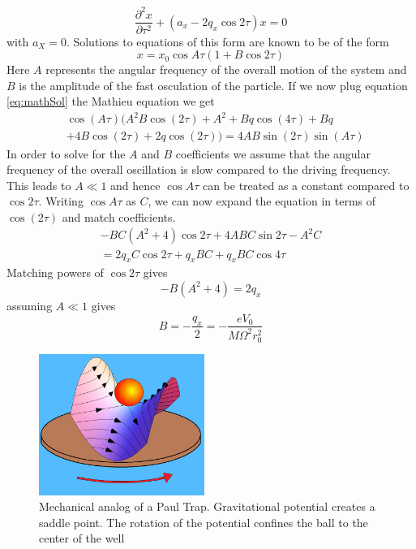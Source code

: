 \documentclass[aps,prb,twocolumn,superscriptaddress]{revtex4-1}
\begin{document}
\begin{equation}
\frac{\partial^2x}{\partial\tau^2} + \left(a_x - 2q_x\cos{2\tau}\right)x=0
\label{eq:matheq}
\end{equation}
with $a_X=0$. Solutions to equations of this form are known to be of the form
\begin{equation}
x=x_0\cos{A\tau}\left(1+B\cos{2\tau}\right)
\label{eq:mathSol}
\end{equation}
Here $A$ represents the angular frequency of the overall motion of the system and $B$ is the amplitude of the fast osculation of the particle. If we now plug equation \ref{eq:mathSol} the Mathieu equation we get
\begin{equation}
\begin{split}
&\cos (A \tau ) (A^2 B \cos (2 \tau )+A^2+B q \cos (4 \tau )+B q\\
&+4 B \cos (2 \tau )+2 q \cos (2 \tau ))=4 A B \sin (2 \tau ) \sin (A \tau )
\end{split}
\end{equation}
In order to solve for the $A$ and $B$ coefficients we assume that the angular frequency of the overall oscillation is slow compared to the driving frequency. This leads to $A\ll 1$ and hence $\cos{A\tau}$ can be treated as a constant compared to $\cos{2\tau}$. Writing $\cos{A\tau}$ as $C$, we can now expand the equation in terms of $\cos(2\tau)$ and match coefficients.
\begin{equation}
\begin{split}
-BC\left(A^2+4\right)\cos{2\tau}+4ABC\sin{2\tau}-A^2C\\
=2q_xC\cos{2\tau}+q_xBC+q_xBC\cos{4\tau}
\end{split}
\end{equation}
Matching powers of $\cos{2\tau}$ gives
\begin{equation}
-B\left(A^2+4\right)=2q_x
\end{equation}
assuming $A\ll1$ gives
\begin{equation}
B=-\frac{q_x}{2}=-\frac{eV_0}{M\Omega^2r_0^2}
\end{equation}
\begin{figure}
	\begin{center}
		\includegraphics[width=0.48\textwidth]{rotatingSaddle.png}
	\end{center}
	\vspace{-2mm}
	\caption{Mechanical analog of a Paul Trap. Gravitational potential creates a saddle point. The rotation of the potential confines the ball to the center of the well}
	\label{fig:mech}
	\vspace{-3mm}
\end{figure}
\end{document}
